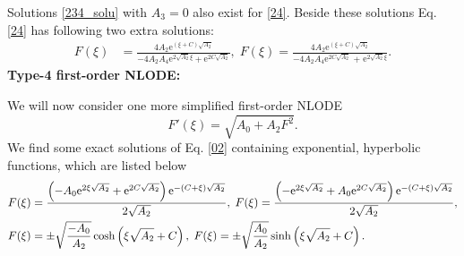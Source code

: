 \documentclass[prd,aps,floats,showkeys,nofootinbib,notitlepage]{revtex4-2}
\begin{document}
	Solutions \eqref{234_solu} with $A_3=0$ also exist for \eqref{24}. Beside these solutions Eq. \eqref{24} has following two extra solutions:
	\begin{subequations}\label{24_solu}
		\begin{align}
			F(\xi) &=   \frac{{4{A_2} {{\text{e}}^{\left( {\xi  + C} \right)\sqrt {{A_2}} }}}}{{ - 4 {A_2} {A_4} {{\text{e}}^{2 \sqrt {{A_2}} \xi }} + {{\text{e}}^{2 C \sqrt {{A_2}} }}}}, \;
			F(\xi) =   \frac{{4{A_2} {{\text{e}}^{\left( {\xi  + C} \right)\sqrt {{A_2}} }}}}{{ - 4 {A_2} {A_4} {{\text{e}}^{2 C \sqrt {{A_2}} }}{\text{ + }}{{\text{e}}^{2 \sqrt {{A_2}} \xi }}}}.
		\end{align}
	\end{subequations}
	\textbf{Type-4 first-order NLODE:}
	\par We will now consider one more simplified first-order NLODE
	\begin{equation}\label{02}
		F'(\xi ) = \sqrt{{A_0} + {A_2}{F^2}}.
	\end{equation}
	We find some exact solutions of Eq. \eqref{02} containing exponential, hyperbolic functions, which are listed below
	\begin{subequations}\label{02_solu}
		\begin{align}
			F(\xi) &=  \frac{{\left( { - {A_0} {{\text{e}}^{2 \xi \sqrt {{A_2}} }} + {{\text{e}}^{2 C\sqrt {{A_2}} }}} \right){{\text{e}}^{ - \left( {C + \xi } \right)\sqrt {{A_2}} }}}}{{2\sqrt {{A_2}} }}, \;
			F(\xi) =  \frac{{\left( { -  {{\text{e}}^{2 \xi \sqrt {{A_2}} }} + {A_0}{{\text{e}}^{2 C\sqrt {{A_2}} }}} \right){{\text{e}}^{ - \left( {C + \xi } \right)\sqrt {{A_2}} }}}}{{2\sqrt {{A_2}} }}, \hfill \\
			F(\xi) &=   \pm \sqrt {\frac{{ - {A_0}}}{{{A_2}}}} \cosh \left( {\xi \sqrt {{A_2}}  + C} \right), \;
			F(\xi) =   \pm \sqrt {\frac{{{A_0}}}{{{A_2}}}} \sinh \left( {\xi \sqrt {{A_2}}  + C} \right). 
		\end{align}
	\end{subequations}
	
	
	
\end{document}
